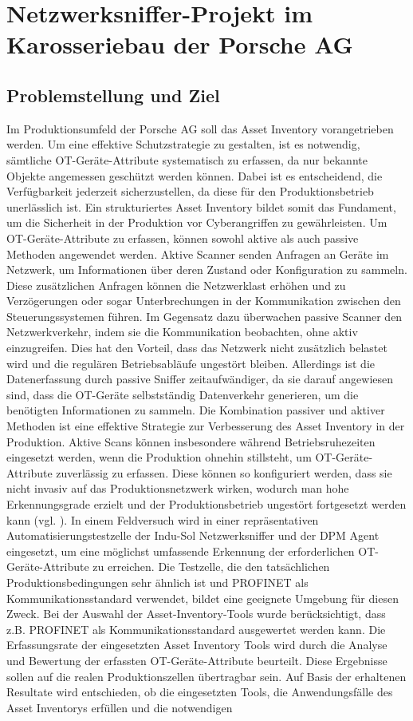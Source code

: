 \section{Netzwerksniffer-Projekt im Karosseriebau der Porsche AG}

\subsection{Problemstellung und Ziel}
Im Produktionsumfeld der Porsche AG soll das Asset Inventory vorangetrieben werden. Um eine effektive Schutzstrategie zu gestalten, ist es notwendig, sämtliche OT-Geräte-Attribute systematisch zu erfassen, da nur bekannte Objekte angemessen geschützt werden können. Dabei ist es entscheidend, die Verfügbarkeit jederzeit sicherzustellen, da diese für den Produktionsbetrieb unerlässlich ist. Ein strukturiertes Asset Inventory bildet somit das Fundament, um die Sicherheit in der Produktion vor Cyberangriffen zu gewährleisten. Um OT-Geräte-Attribute zu erfassen, können sowohl aktive als auch passive Methoden angewendet werden. Aktive Scanner senden Anfragen an Geräte im Netzwerk, um Informationen über deren Zustand oder Konfiguration zu sammeln. Diese zusätzlichen Anfragen können die Netzwerklast erhöhen und zu Verzögerungen oder sogar Unterbrechungen in der Kommunikation zwischen den Steuerungssystemen führen. Im Gegensatz dazu überwachen passive Scanner den Netzwerkverkehr, indem sie die Kommunikation beobachten, ohne aktiv einzugreifen. Dies hat den Vorteil, dass das Netzwerk nicht zusätzlich belastet wird und die regulären Betriebsabläufe ungestört bleiben. Allerdings ist die Datenerfassung durch passive Sniffer zeitaufwändiger, da sie darauf angewiesen sind, dass die OT-Geräte selbstständig Datenverkehr generieren, um die benötigten Informationen zu sammeln. Die Kombination passiver und aktiver Methoden ist eine effektive Strategie zur Verbesserung des Asset Inventory in der Produktion. Aktive Scans können insbesondere während Betriebsruhezeiten eingesetzt werden, wenn die Produktion ohnehin stillsteht, um OT-Geräte-Attribute zuverlässig zu erfassen. Diese können so konfiguriert werden, dass sie nicht invasiv auf das Produktionsnetzwerk wirken, wodurch man hohe Erkennungsgrade erzielt und der Produktionsbetrieb ungestört fortgesetzt werden kann (vgl. \cite{aktivScan}). In einem Feldversuch wird in einer repräsentativen Automatisierungstestzelle der Indu-Sol Netzwerksniffer und der DPM Agent eingesetzt, um eine möglichst umfassende Erkennung der erforderlichen OT-Geräte-Attribute zu erreichen. Die Testzelle, die den tatsächlichen Produktionsbedingungen sehr ähnlich ist und PROFINET als Kommunikationsstandard verwendet, bildet eine geeignete Umgebung für diesen Zweck. Bei der Auswahl der Asset-Inventory-Tools wurde berücksichtigt, dass z.B. PROFINET als Kommunikationsstandard ausgewertet  werden kann. Die Erfassungsrate der eingesetzten Asset Inventory Tools wird durch die Analyse und Bewertung der erfassten OT-Geräte-Attribute beurteilt. Diese Ergebnisse sollen auf die realen Produktionszellen übertragbar sein. Auf Basis der erhaltenen Resultate wird entschieden, ob die eingesetzten Tools, die Anwendungsfälle des Asset Inventorys erfüllen und die notwendigen 